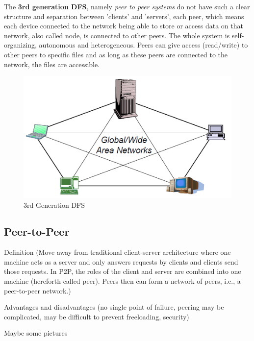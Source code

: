 The \textbf{3rd generation DFS}, namely \textit{peer to peer systems} do not have such a clear structure and separation between 'clients' and 'servers', each peer, which means each device connected to the network being able to store or access data on that network, also called node, is connected to other peers. The whole system is self-organizing, autonomous and heterogeneous. Peers can give access (read/write) to other peers to specific files and as long as these peers are connected to the network, the files are accessible.
	
	\begin{figure}[ht]
		\begin{center}
		\includegraphics[scale=0.8]{Talk5/3rd_gen_dfs.PNG}
		\end{center}
		\caption{3rd Generation DFS \cite{p2pfswu}}
		\label{3rd_gen_dfs}
	\end{figure}

\subsection{Peer-to-Peer}
Definition (Move away from traditional client-server architecture where one machine acts as a server and only answers requests by clients and clients send those requests. In P2P, the roles of the client and server are combined into one machine (hereforth called peer). Peers then can form a network of peers, i.e., a peer-to-peer network.)

Advantages and disadvantages (no single point of failure, peering may be complicated, may be difficult to prevent freeloading, security)

Maybe some pictures

